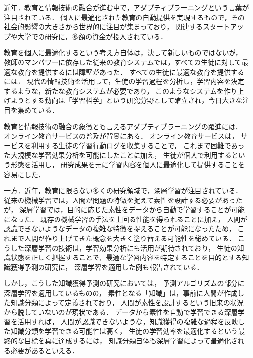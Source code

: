 近年，教育と情報技術の融合が進む中で，アダプティブラーニングという言葉が注目されている．
個人に最適化された教育の自動提供を実現するもので，その社会的影響の大きさから世界的に注目が集まっており，
関連するスタートアップや大学での研究に，多額の資金が投入されている．

教育を個人に最適化するという考え方自体は，決して新しいものではないが，
教師のマンパワーに依存した従来の教育システムでは，すべての生徒に対して最適な教育を提供するには障壁があった．
すべての生徒に最適な教育を提供するには，
現代の情報技術を活用して，生徒の学習過程を分析し，学習内容を決定するような，新たな教育システムが必要であり，
このようなシステムを作り上げようとする動向は「学習科学」という研究分野として確立され，今日大きな注目を集めている．


教育と情報技術の融合の象徴とも言えるアダプティブラーニングの躍進には．
オンライン教育サービスの普及が背景にある．
オンライン教育サービスは，
サービスを利用する生徒の学習行動ログを収集することで，
これまで困難であった大規模な学習効果分析を可能にしたことに加え，
生徒が個人で利用するという形態を活用し，
研究成果を元に学習内容を個人に最適化して提供することを容易にした．


一方，近年，教育に限らない多くの研究領域で，深層学習が注目されている．
従来の機械学習では，人間が問題の特徴を捉えて素性を設計する必要があったが，
深層学習では，目的に応じた素性をデータから自動で学習することが可能になった．
既存の機械学習の手法を上回る性能を得られることに加え，
人間が認識できないようなデータの複雑な特徴を捉えることが可能になったため，
これまで人間が作り上げてきた概念を大きく塗り替える可能性を秘めている．
こうした深層学習の技術は，学習効果分析にも活用が期待されており，
生徒の知識状態を正しく把握することで，最適な学習内容を特定することを目的とする知識獲得予測の研究に，
深層学習を適用した例も報告されている．

しかし，こうした知識獲得予測の研究においては，
予測アルゴリズムの部分に深層学習を適用しているものの，
素性となる「知識」は，事前に人間が作成した知識分類によって定義されており，
人間が素性を設計するという旧来の状況から脱していないのが現状である．
データから素性を自動で学習できる深層学習を活用すれば，
人間が認識できないような，知識獲得の複雑な過程を反映した知識分類を学習できる可能性は高く，
生徒の学習効率を最適化するという最終的な目標を真に達成するには，
知識分類自体も深層学習によって最適化される必要があるといえる．


